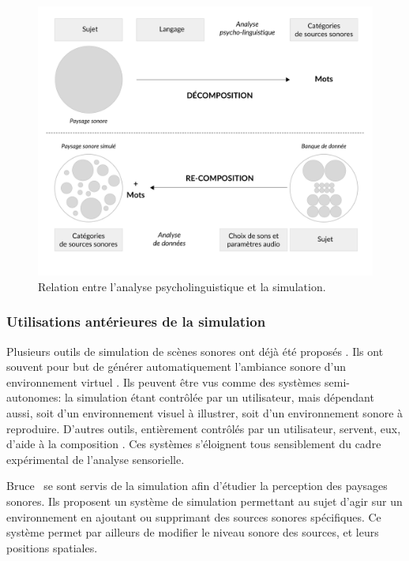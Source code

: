 \begin{figure}[t]
        \myfloatalign
        \includegraphics[width=.8\linewidth]{gfx/ch_4/1}
       \caption{Relation entre l'analyse psycholinguistique et la simulation.}\label{fig:paradigmeSimu1}
\end{figure}
 
\subsubsection{Utilisations antérieures de la simulation}

Plusieurs outils de simulation de scènes sonores ont déjà été proposés \citep{misra2006new,misra2007musical,valle2009framework,finney2010soundscape,schirosa2010system}. Ils ont souvent pour but de générer automatiquement l'ambiance sonore d'un environnement virtuel \citep{valle2009framework,finney2010soundscape}. Ils peuvent être vus comme des systèmes semi-autonomes: la simulation étant contrôlée par un utilisateur, mais dépendant aussi, soit d'un environnement visuel à illustrer, soit d'un environnement sonore à reproduire. D'autres outils, entièrement contrôlés par un utilisateur, servent, eux, d'aide à la composition \citep{misra2006new,misra2007musical}. Ces systèmes s'éloignent tous sensiblement du cadre expérimental de l'analyse sensorielle.

Bruce~\al \citep{bruce2009development,bruce2014effects} se sont servis de la simulation afin d'étudier la perception des paysages sonores. Ils proposent un système de simulation permettant au sujet d'agir sur un environnement en ajoutant ou supprimant des sources sonores spécifiques. Ce système permet par ailleurs de modifier le niveau sonore des sources, et leurs positions spatiales.

